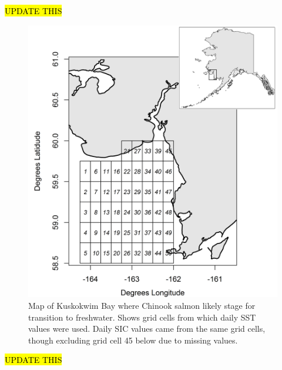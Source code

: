 \documentclass[12pt,]{book}
\theoremstyle{definition}
\theoremstyle{definition}
\theoremstyle{definition}
\theoremstyle{remark}
\begin{document}
\clearpage

\hl{UPDATE THIS}

\begin{figure}
  \centering
  \includegraphics{img/Ch2/map.png}
  \caption{Map of Kuskokwim Bay where Chinook salmon likely stage for transition to freshwater. Shows grid cells from which daily SST values were used. Daily SIC values came from the same grid cells, though excluding grid cell 45 below due to missing values.}
  \label{fig:ch2-map}
\end{figure}

\clearpage

\hl{UPDATE THIS}
\end{document}
